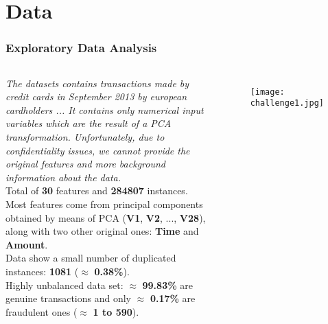 \documentclass[11pt]{beamer}
\begin{document}
\section{Data}

\begin{frame}[fragile]
  \frametitle{\normalsize{\textbf{
    Exploratory Data Analysis
  }}} 

  \scriptsize{  
    \begin{columns}
      
      \textbullet \: \textit{The datasets contains transactions made by credit 
      cards in September 2013 by european cardholders ... It contains only 
      numerical input variables which are the result of a PCA transformation. 
      Unfortunately, due to confidentiality issues, we cannot provide the 
      original features and more background information about the data.} \\[0.05cm]

      \textbullet \: Total of \textbf{30} features and \textbf{284807} 
      instances. \\[0.05cm]
  
      \textbullet \: Most features come from principal components obtained by 
      means of PCA (\textbf{V1}, \textbf{V2}, ..., \textbf{V28}), along with 
      two other original ones: \textbf{Time} and \textbf{Amount}. \\[0.05cm]
  
      \textbullet \: Data show a small number of duplicated instances: 
      \textbf{1081} ($\approx$ \textbf{0.38\%}). \\[0.05cm]
  
      \textbullet \: Highly unbalanced data set: $\approx$ \textbf{99.83\%} are 
      genuine transactions and only $\approx$ \textbf{0.17\%} are fraudulent ones 
      ($\approx$ \textbf{1 to 590}).


      \begin{figure}[h!]
        \centering
        \texttt{[image: challenge1.jpg]}
      \end{figure}

    \end{columns}
  }
\end{frame}
\end{document}
